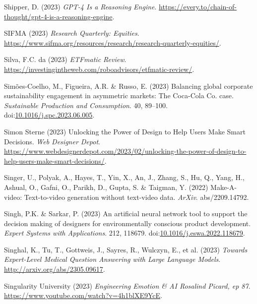 \documentclass[
  letterpaper,
  DIV=11,
  numbers=noendperiod]{scrartcl}
\newlength{\cslhangindent}
\newenvironment{CSLReferences}[2] %
 {\begin{list}{}{%
  \setlength{\itemindent}{0pt}
  \setlength{\leftmargin}{0pt}
  \setlength{\parsep}{0pt}
  \ifodd #1
   \setlength{\leftmargin}{\cslhangindent}
   \setlength{\itemindent}{-1\cslhangindent}
  \fi
  \setlength{\itemsep}{#2\baselineskip}}}
 {\end{list}}
\begin{document}
\begin{CSLReferences}{0}{1}
Shipper, D. (2023) \emph{{GPT-4 Is} a {Reasoning Engine}}.
\url{https://every.to/chain-of-thought/gpt-4-is-a-reasoning-engine}.

SIFMA (2023) \emph{Research {Quarterly}: {Equities}}.
\url{https://www.sifma.org/resources/research/research-quarterly-equities/}.

Silva, F.C. da (2023) \emph{{ETFmatic Review}}.
\url{https://investingintheweb.com/roboadvisors/etfmatic-review/}.

Simões-Coelho, M., Figueira, A.R. \& Russo, E. (2023) Balancing global
corporate sustainability engagement in asymmetric markets: {The
Coca-Cola Co}. case. \emph{Sustainable Production and Consumption}. 40,
89--100.
doi:\href{https://doi.org/10.1016/j.spc.2023.06.005}{10.1016/j.spc.2023.06.005}.

Simon Sterne (2023) Unlocking the {Power} of {Design} to {Help Users
Make Smart Decisions}. \emph{Web Designer Depot}.
\url{https://www.webdesignerdepot.com/2023/02/unlocking-the-power-of-design-to-help-users-make-smart-decisions/}.

Singer, U., Polyak, A., Hayes, T., Yin, X., An, J., Zhang, S., Hu, Q.,
Yang, H., Ashual, O., Gafni, O., Parikh, D., Gupta, S. \& Taigman, Y.
(2022) Make-{A-video}: {Text-to-video} generation without text-video
data. \emph{ArXiv}. abs/2209.14792.

Singh, P.K. \& Sarkar, P. (2023) An artificial neural network tool to
support the decision making of designers for environmentally conscious
product development. \emph{Expert Systems with Applications}. 212,
118679.
doi:\href{https://doi.org/10.1016/j.eswa.2022.118679}{10.1016/j.eswa.2022.118679}.

Singhal, K., Tu, T., Gottweis, J., Sayres, R., Wulczyn, E., et al.
(2023) \emph{Towards {Expert-Level Medical Question Answering} with
{Large Language Models}}. \url{http://arxiv.org/abs/2305.09617}.

Singularity University (2023) \emph{Engineering {Emotion} \& {AI}
{\textbar} {Rosalind Picard}, ep 87}.
\url{https://www.youtube.com/watch?v=4h1blXE9YcE}.


\end{CSLReferences}
\end{document}
